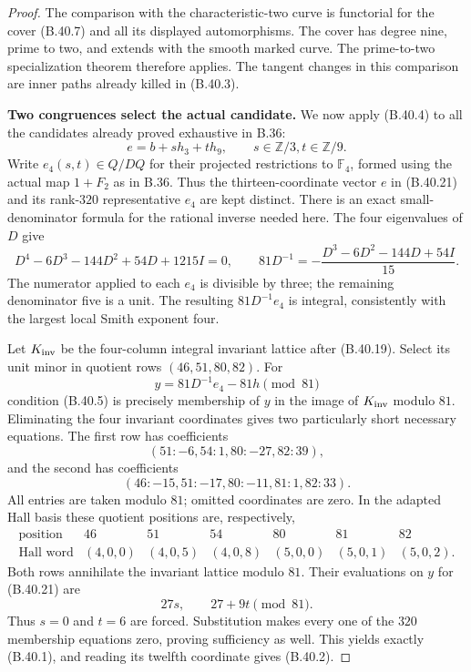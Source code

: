 \begin{proof}
The comparison with the characteristic-two curve is
functorial for the cover (B.40.7) and all its displayed
automorphisms. The cover has degree nine, prime to two,
and extends with the smooth marked curve.
The prime-to-two specialization theorem
\citep[XIII, \S\S2.9--2.12]{BSGA1} therefore applies.
The tangent changes in this comparison are inner paths
already killed in (B.40.3).

\par\smallskip\noindent\textbf{Two congruences select the actual candidate.}\enspace 
We now apply (B.40.4) to all the candidates already
proved exhaustive in B.36:
\[
                 e=b+s h_3+t h_9,\qquad
                    s\in\mathbb Z/3, t\in\mathbb Z/9.
                                                               \tag{B.40.21}
\]
Write $e_4(s,t)\in Q/DQ$ for their projected restrictions
to $\mathbb F_4$, formed using the actual map $1+F_2$
as in B.36. Thus the thirteen-coordinate vector $e$ in
(B.40.21) and its rank-$320$ representative $e_4$ are
kept distinct.
There is an exact small-denominator formula for the
rational inverse needed here. The four eigenvalues
of $D$ give
\[
 D^4-6D^3-144D^2+54D+1215I=0,\qquad
 81D^{-1}=-\frac{D^3-6D^2-144D+54I}{15}.                       \tag{B.40.22}
\]
The numerator applied to each $e_4$ is divisible by three;
the remaining denominator five is a unit.
The resulting $81D^{-1}e_4$ is integral, consistently with
the largest local Smith exponent four.

Let $K_{\rm inv}$ be the four-column integral invariant
lattice after (B.40.19). Select its unit minor in
quotient rows $(46,51,80,82)$.
For
\[
                 y=81D^{-1}e_4-81h\pmod {81}
\]
condition (B.40.5) is precisely membership of $y$ in
the image of $K_{\rm inv}$ modulo $81$.
Eliminating the four invariant coordinates gives two
particularly short necessary equations. The first row
has coefficients
\[
 (51:-6, 54:1, 80:-27, 82:39),
\]
and the second has coefficients
\[
 (46:-15, 51:-17, 80:-11, 81:1, 82:33).
\]
All entries are taken modulo $81$; omitted coordinates
are zero. In the adapted Hall basis these quotient
positions are, respectively,
\[
\begin{array}{c|rrrrrr}
 \text{position}&46&51&54&80&81&82\\ \hline
 \text{Hall word}&(4,0,0)&(4,0,5)&(4,0,8)&(5,0,0)&(5,0,1)&(5,0,2).
\end{array}
\]
Both rows annihilate the invariant lattice modulo $81$.
Their evaluations on $y$ for (B.40.21) are
\[
                  27s,\qquad 27+9t\pmod {81}.                \tag{B.40.23}
\]
Thus $s=0$ and $t=6$ are forced.
Substitution makes every one of the $320$ membership
equations zero, proving sufficiency as well.
This yields exactly (B.40.1), and reading its twelfth
coordinate gives (B.40.2).


\end{proof}

